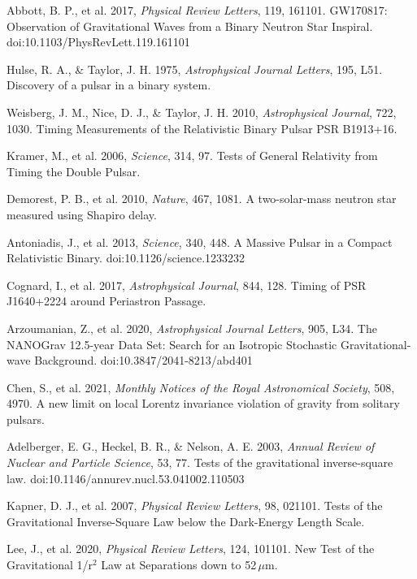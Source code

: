 \documentclass[fleqn,usenatbib]{mnras}
\begin{document}
\begin{thebibliography}{99}
 Abbott, B. P., et al. 2017, \textit{Physical Review Letters}, 119, 161101. GW170817: Observation of Gravitational Waves from a Binary Neutron Star Inspiral. doi:10.1103/PhysRevLett.119.161101

 Hulse, R. A., \& Taylor, J. H. 1975, \textit{Astrophysical Journal Letters}, 195, L51. Discovery of a pulsar in a binary system.

 Weisberg, J. M., Nice, D. J., \& Taylor, J. H. 2010, \textit{Astrophysical Journal}, 722, 1030. Timing Measurements of the Relativistic Binary Pulsar PSR B1913+16.

 Kramer, M., et al. 2006, \textit{Science}, 314, 97. Tests of General Relativity from Timing the Double Pulsar.

 Demorest, P. B., et al. 2010, \textit{Nature}, 467, 1081. A two-solar-mass neutron star measured using Shapiro delay.

 Antoniadis, J., et al. 2013, \textit{Science}, 340, 448. A Massive Pulsar in a Compact Relativistic Binary. doi:10.1126/science.1233232

 Cognard, I., et al. 2017, \textit{Astrophysical Journal}, 844, 128. Timing of PSR J1640+2224 around Periastron Passage.

 Arzoumanian, Z., et al. 2020, \textit{Astrophysical Journal Letters}, 905, L34. The NANOGrav 12.5-year Data Set: Search for an Isotropic Stochastic Gravitational-wave Background. doi:10.3847/2041-8213/abd401

 Chen, S., et al. 2021, \textit{Monthly Notices of the Royal Astronomical Society}, 508, 4970. A new limit on local Lorentz invariance violation of gravity from solitary pulsars.

 Adelberger, E. G., Heckel, B. R., \& Nelson, A. E. 2003, \textit{Annual Review of Nuclear and Particle Science}, 53, 77. Tests of the gravitational inverse-square law. doi:10.1146/annurev.nucl.53.041002.110503

 Kapner, D. J., et al. 2007, \textit{Physical Review Letters}, 98, 021101. Tests of the Gravitational Inverse-Square Law below the Dark-Energy Length Scale.

 Lee, J., et al. 2020, \textit{Physical Review Letters}, 124, 101101. New Test of the Gravitational 1/r$^2$ Law at Separations down to 52\,$\mu$m.


\end{thebibliography}
\end{document}

